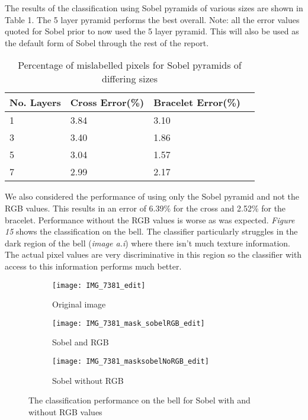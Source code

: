\documentclass[12pt]{IIBproject}
\begin{document}
The results of the classification using Sobel pyramids of various sizes are shown in Table 1. The 5 layer pyramid performs the best overall. Note: all the error values quoted for Sobel prior to now  used the 5 layer pyramid. This will also be used as the default form of Sobel through the rest of the report.
\begin{table}[H]
\begin{center}
    \begin{tabular}{ | l | l | l | p{5cm} |}
    \hline
    No. Layers & Cross Error(\%) & Bracelet Error(\%) \\ \hline
    1 & 3.84 & 3.10 \\ \hline
    3 & 3.40 & 1.86 \\ \hline
    5 & 3.04 & 1.57 \\
    \hline
    7 & 2.99 & 2.17 \\
    \hline
    
    \end{tabular}
    \caption{Percentage of mislabelled pixels for Sobel pyramids of differing sizes}\label{table:somename}
\end{center}
\end{table}
We also considered the performance of using only the Sobel pyramid and not the RGB values. This results in an error of 6.39\% for the cross and 2.52\% for the bracelet. Performance without the RGB values is worse as was expected. \emph{Figure 15} shows the classification on the bell. The classifier particularly struggles in the dark region of the bell (\emph{image a.i}) where there isn't much texture information. The actual pixel values are very discriminative in this region so the classifier with access to this information performs much better.
\begin{figure}[H]
\centering
\begin{subfigure}{.5\textwidth}
  \centering
  \texttt{[image: IMG\_7381\_edit]}
  \caption{Original image}
  \label{fig:sub2}
\end{subfigure}
\begin{subfigure}{.5\textwidth}
  \centering
  \texttt{[image: IMG\_7381\_mask\_sobelRGB\_edit]}
  \caption{Sobel and RGB}
  \label{fig:sub1}
\end{subfigure}%
\begin{subfigure}{.5\textwidth}
  \centering
  \texttt{[image: IMG\_7381\_masksobelNoRGB\_edit]}
  \caption{Sobel without RGB}
  \label{fig:sub2}
\end{subfigure}

\caption{The classification performance on the bell for Sobel with and without RGB values}
\label{fig:test}
\end{figure}
\end{document}
